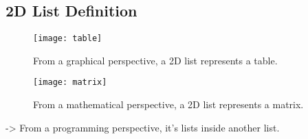 \subsection{2D List Definition}
\begin{figure}[h]
	\centering
	\texttt{[image: table]}
	\caption{From a graphical perspective, a 2D list represents a table.}
	\label{fig:table}
\end{figure}
\begin{figure}[h]
	\centering
	\texttt{[image: matrix]}
	\caption{From a mathematical perspective, a 2D list represents a matrix.}
	\label{fig:matrix}
\end{figure}

-> From a programming perspective, it's lists inside another list.


